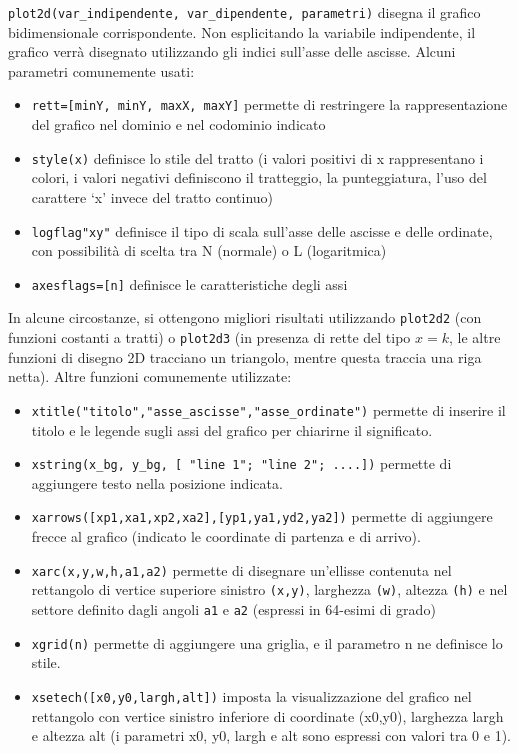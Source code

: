 \verb+plot2d(var_indipendente, var_dipendente, parametri)+ disegna il grafico bidimensionale corrispondente. Non esplicitando la variabile indipendente, il grafico verr\`a disegnato utilizzando gli indici sull'asse delle ascisse.
Alcuni parametri comunemente usati:
\begin{itemize}
\item \verb+rett=[minY, minY, maxX, maxY]+ permette di restringere la rappresentazione del grafico nel dominio e nel codominio indicato
\item \verb+style(x)+ definisce lo stile del tratto (i valori positivi di x rappresentano i colori, i valori negativi definiscono il tratteggio, la punteggiatura, l'uso del carattere `x' invece del tratto continuo)
\item \verb+logflag"xy"+ definisce il tipo di scala sull'asse delle ascisse e delle ordinate, con possibilit\`a di scelta tra N (normale) o L (logaritmica)
\item \verb+axesflags=[n]+ definisce le caratteristiche degli assi
\end{itemize}

In alcune circostanze, si ottengono migliori risultati utilizzando \verb+plot2d2+ (con funzioni costanti a tratti) o \verb+plot2d3+ (in presenza di rette del tipo $x=k$, le altre funzioni di disegno 2D tracciano un triangolo, mentre questa traccia una riga netta).
Altre funzioni comunemente utilizzate:
\begin{itemize}
\item \verb+xtitle("titolo","asse_ascisse","asse_ordinate")+ permette di inserire il titolo e le legende sugli assi del grafico per chiarirne il significato.
\item \verb+xstring(x_bg, y_bg, [ "line 1"; "line 2"; ....])+ permette di aggiungere testo nella posizione indicata.
\item \verb+xarrows([xp1,xa1,xp2,xa2],[yp1,ya1,yd2,ya2])+ permette di aggiungere frecce al grafico (indicato le coordinate di partenza e di arrivo).
\item \verb+xarc(x,y,w,h,a1,a2)+ permette di disegnare un'ellisse contenuta nel rettangolo di vertice superiore sinistro \verb+(x,y)+, larghezza \verb+(w)+, altezza \verb+(h)+ e nel settore definito dagli angoli \verb+a1+ e \verb+a2+ (espressi in 64-esimi di grado) 
\item \verb+xgrid(n)+ permette di aggiungere una griglia, e il parametro n ne definisce lo stile.
\item \verb+xsetech([x0,y0,largh,alt])+ imposta la visualizzazione del grafico nel rettangolo con vertice sinistro inferiore di coordinate (x0,y0), larghezza largh e altezza alt (i parametri x0, y0, largh e alt sono espressi con valori tra 0 e 1).
\end{itemize}

